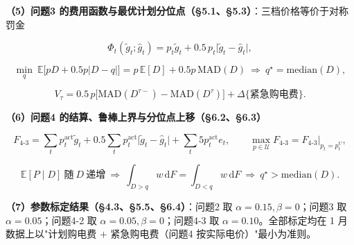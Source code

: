 \textbf{（5）问题3 的费用函数与最优计划分位点（\S5.1、\S5.3）}：三档价格等价于对称罚金

\begin{equation}
  \Phi_t(\tilde g_t;\hat g_t)=p_t\tilde g_t+0.5\,p_t\big|\tilde g_t-\hat g_t\big|,
  \label{eq:sum-penalty}
\end{equation}

\begin{equation}
  \min_q\ \mathbb{E}\big[pD+0.5p|D-q|\big]=p\,\mathbb{E}[D]+0.5p\,\mathrm{MAD}(D)
  \ \Longrightarrow\ q^\star=\mathrm{median}(D),
  \label{eq:sum-median}
\end{equation}

\begin{equation}
  V_\tau=0.5\,p\big[\mathrm{MAD}(D^{\tau-})-\mathrm{MAD}(D^{\tau})\big]+\Delta\{\text{紧急购电费}\}.
  \label{eq:sum-value}
\end{equation}

\textbf{（6）问题4 的结算、鲁棒上界与分位点上移（\S6.2、\S6.3）}

\begin{equation}
  F_{4\text{-}3}=\sum_tp_t^{\text{act}}\tilde g_t+0.5\sum_tp_t^{\text{act}}\big|\tilde g_t-\hat g_t\big|
  +\sum_t5p_t^{\text{act}}e_t,\qquad
  \max_{p\in\mathcal U}F_{4\text{-}3}=F_{4\text{-}3}\big|_{p_t=p^{U}_t},
  \label{eq:sum-p4}
\end{equation}

\begin{equation}
  \mathbb{E}[P\mid D]\ \text{随}\ D\ \text{递增}\ \Longrightarrow\
  \int_{D>q}w\,\mathrm{d}F=\int_{D<q}w\,\mathrm{d}F\ \Longrightarrow\ q^\star>\mathrm{median}(D).
  \label{eq:sum-qstar}
\end{equation}

\textbf{（7）参数标定结果（\S4.3、\S5.5、\S6.4）}：问题2 取 $\alpha=0.15,\beta=0$；问题3 取 $\alpha=0.05$；问题4-2 取 $\alpha=0.05,\beta=0$；问题4-3 取 $\alpha=0.10$。全部标定均在 1 月数据上以"计划购电费 $+$ 紧急购电费（问题4 按实际电价）"最小为准则。
\endgroup

